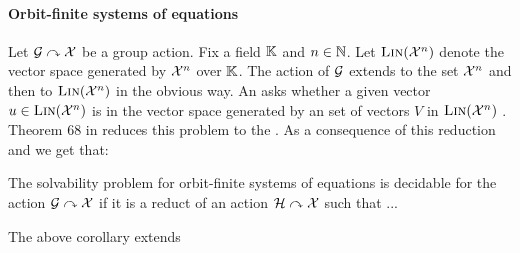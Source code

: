 \paragraph{Orbit-finite systems of equations}
%
Let $\mathcal{G}\curvearrowright\mathcal{X}$ be a group action.
Fix a field $\mathbb{K}$ and $n\in\mathbb{N}$.
Let $\textsc{Lin}(\mathcal{X}^n)$ denote the vector space generated by $\mathcal{X}^n$ over $\mathbb{K}$.
The action of $\mathcal{G}$ extends to the set $\mathcal{X}^n$ and then to $\textsc{Lin}(\mathcal{X}^n)$ in the obvious way.
An  asks whether a given vector $u\in\textsc{Lin}(\mathcal{X}^n)$ is in the vector space generated by an  set of vectors $V$ in $\textsc{Lin}(\mathcal{X}^n)$ \cite[Section 9]{GHOLAS24}.
Theorem 68 in \cite{GHOLAS24} reduces this problem to the .
As a consequence of this reduction and  we get that:
\begin{corollary}\label{cor:lin solv}
The solvability problem for orbit-finite systems of equations is decidable for the action $\mathcal{G}\curvearrowright\mathcal{X}$ if it is a reduct of an action $\mathcal{H}\curvearrowright\mathcal{X}$ such that ...
\end{corollary}
%
The above corollary extends 
%

%
